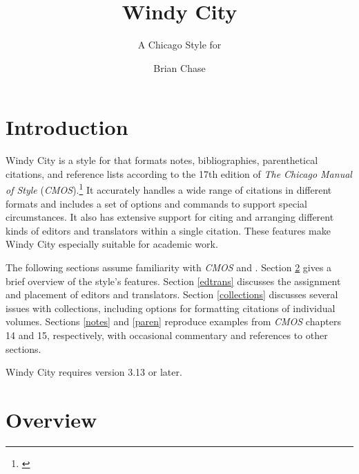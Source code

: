 \documentclass[11pt,letterpaper,oneside]{article}
\begin{document}
\title{Windy City}
\subtitle{A Chicago Style for \texttt{\biblatex}}
\author{Brian Chase}
\maketitle
\begingroup
\hypersetup{linkcolor=black}
\tableofcontents{}
\endgroup

\section{Introduction}


Windy City is a style for \biblatex that formats notes,
bibliographies, parenthetical citations, and reference lists according
to the 17th edition of \textit{The Chicago Manual of Style}
(\textit{CMOS}).\footnote{\cite{chicago2017}} It accurately handles a
wide range of citations in different formats and includes a set of
options and commands to support special circumstances. It also has
extensive support for citing and arranging different kinds of editors
and translators within a single citation. These features make Windy
City especially suitable for academic work.

The following sections assume familiarity with \textit{CMOS} and
\biblatex. Section \ref{overview} gives a brief overview of the
style's features. Section \ref{edtrans} discusses the assignment and
placement of editors and translators. Section \ref{collections}
discusses several issues with collections, including options for
formatting citations of individual volumes. Sections \ref{notes} and
\ref{paren} reproduce examples from \textit{CMOS} chapters 14 and 15,
respectively, with occasional commentary and references to other
sections.

Windy City requires \biblatex version 3.13 or later.

\section{Overview}
\label{overview}
\end{document}
